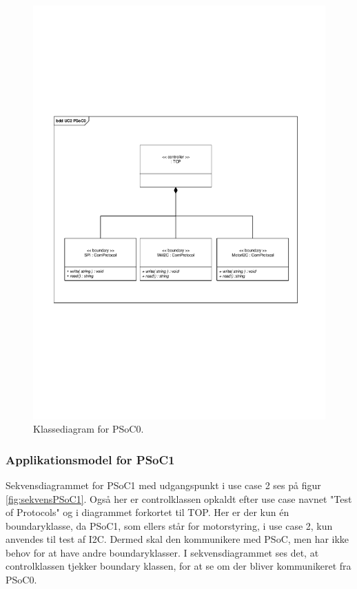 \begin{figure}[H]
	\centering
	\includegraphics[trim = {1.2cm 8.2cm 1.8cm 7.7cm}, clip = true, width=\textwidth] {Systemarkitektur/images/klassediagramPSoC0.pdf}
	\caption{Klassediagram for PSoC0.}
	\label{fig:klassePSoC0}
\end{figure}

\subsubsection{Applikationsmodel for PSoC1}
Sekvensdiagrammet for PSoC1 med udgangspunkt i use case 2 ses på figur \ref{fig:sekvensPSoC1}. Også her er controlklassen opkaldt efter use case navnet "Test of Protocols" og i diagrammet forkortet til TOP. Her er der kun én boundaryklasse, da PSoC1, som ellers står for motorstyring, i use case 2, kun anvendes til test af I2C. Dermed skal den kommunikere med PSoC, men har ikke behov for at have andre boundaryklasser. I sekvensdiagrammet ses det, at controlklassen tjekker boundary klassen, for at se om der bliver kommunikeret fra PSoC0. 

